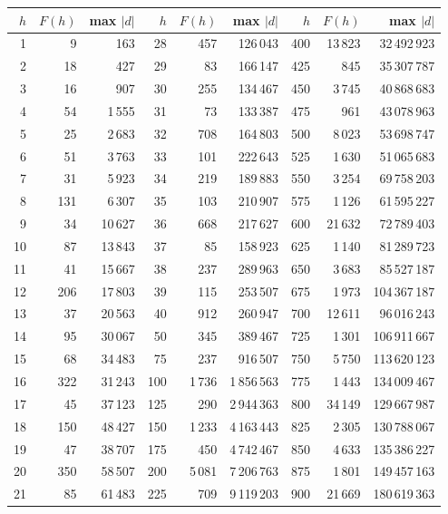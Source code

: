 \begin{center}\small
\begin{tabular}{@{}rrr@{\qquad}rrr@{\qquad}rrr@{}}
\toprule
$h$ & $F(h)$ & max $|d|$ & $h$ & $F(h)$ & max $|d|$ & $h$ & $F(h)$ & max $|d|$\\
\midrule
1 & 9 & 163 & 28 & 457 & 126\,043 & 400 & 13\,823 & 32\,492\,923\\
2 & 18 & 427 & 29 & 83 & 166\,147 & 425 & 845 & 35\,307\,787\\
3 & 16 & 907 & 30 & 255 & 134\,467 & 450 & 3\,745 & 40\,868\,683\\
4 & 54 & 1\,555 & 31 & 73 & 133\,387 & 475 & 961 & 43\,078\,963\\
5 & 25 & 2\,683 & 32 & 708 & 164\,803 & 500 & 8\,023 & 53\,698\,747\\
6 & 51 & 3\,763 & 33 & 101 & 222\,643 & 525 & 1\,630 & 51\,065\,683\\
7 & 31 & 5\,923 & 34 & 219 & 189\,883 & 550 & 3\,254 & 69\,758\,203\\
8 & 131 & 6\,307 & 35 & 103 & 210\,907 & 575 & 1\,126 & 61\,595\,227\\
9 & 34 & 10\,627 & 36 & 668 & 217\,627 & 600 & 21\,632 & 72\,789\,403\\
10 & 87 & 13\,843 & 37 & 85 & 158\,923 & 625 & 1\,140 & 81\,289\,723\\
11 & 41 & 15\,667 & 38 & 237 & 289\,963 & 650 & 3\,683 & 85\,527\,187\\
12 & 206 & 17\,803 & 39 & 115 & 253\,507 & 675 & 1\,973 & 104\,367\,187\\
13 & 37 & 20\,563 & 40 & 912 & 260\,947 & 700 & 12\,611 & 96\,016\,243\\
14 & 95 & 30\,067 & 50 & 345 & 389\,467 & 725 & 1\,301 & 106\,911\,667\\
15 & 68 & 34\,483 & 75 & 237 & 916\,507 & 750 & 5\,750 & 113\,620\,123\\
16 & 322 & 31\,243 & 100 & 1\,736 & 1\,856\,563 & 775 & 1\,443 & 134\,009\,467\\
17 & 45 & 37\,123 & 125 & 290 & 2\,944\,363 & 800 & 34\,149 & 129\,667\,987\\
18 & 150 & 48\,427 & 150 & 1\,233 & 4\,163\,443 & 825 & 2\,305 & 130\,788\,067\\
19 & 47 & 38\,707 & 175 & 450 & 4\,742\,467 & 850 & 4\,633 & 135\,386\,227\\
20 & 350 & 58\,507 & 200 & 5\,081 & 7\,206\,763 & 875 & 1\,801 & 149\,457\,163\\
21 & 85 & 61\,483 & 225 & 709 & 9\,119\,203 & 900 & 21\,669 & 180\,619\,363\\

\end{tabular}
\end{center}
